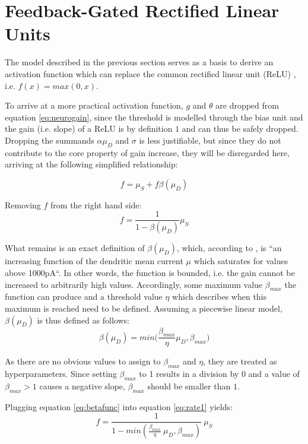 \documentclass{article}
\begin{document}
\section{Feedback-Gated Rectified Linear Units} 
\label{fgrelu}
The model described in the previous section serves as a basis to derive an activation function which can replace the common rectified linear unit (ReLU) \cite{nair2010rectified}, i.e. $f(x) = max(0, x)$.  

To arrive at a more practical activation function, $g$ and $\theta$ are dropped from equation \ref{eq:neurogain}, since the threshold is modelled through the bias unit and the gain (i.e. slope) of a ReLU is by definition $1$ and can thus be safely dropped. Dropping the summands $\alpha \mu_D$ and $\sigma$ is less justifiable, but since they do not contribute to the core property of gain increase, they will be disregarded here, arriving at the following simplified relationship: 

\begin{equation}
	f = \mu_S + f\beta(\mu_D)
\end{equation}

Removing $f$ from the right hand side: 
\begin{equation} 
\label{eq:rate1}
	f = \frac{1}{1 - \beta(\mu_D)} \mu_S
\end{equation}

What remains is an exact definition of $\beta(\mu_D)$, which, according to \cite{larkum2004}, is ``an increasing function of the dendritic mean current $\mu$ which saturates for values above 1000pA``. In other words, the function is bounded, i.e. the gain cannot be increased to arbitrarily high values. Accordingly, some maximum value $\beta_{max}$ the function can produce and a threshold value $\eta$ which describes when this maximum is reached need to be defined. 
Assuming a piecewise linear model, $\beta(\mu_D)$ is thus defined as follows: 
\begin{equation}
\label{eq:betafunc}
	\beta(\mu_D) = min \bigg(\frac{\beta_{max}}{\eta} \mu_D, \beta_{max}\bigg)
\end{equation} 

As there are no obvious values to assign to $\beta_{max}$ and $\eta$, they are treated as hyperparameters. Since setting $\beta_{max}$ to 1 results in a division by $0$ and a value of $\beta_{max} > 1$ causes a negative slope, $\beta_{max}$ should be smaller than $1$. 

Plugging equation \ref{eq:betafunc} into equation \ref{eq:rate1} yields: 
\begin{equation}
	f = \frac{1}{1 - min(\frac{\beta_{max}}{\eta} \ \mu_D, \beta_{max})} \ \mu_S 
\end{equation}
\end{document}
